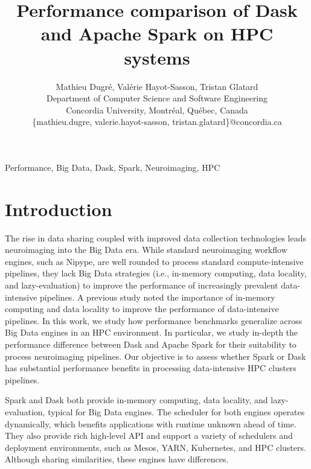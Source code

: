 \documentclass[conference]{IEEEtran}
\begin{document}
\title{Performance comparison of Dask and Apache Spark on HPC systems}

\author{Mathieu Dugr\'e, Val\'erie Hayot-Sasson, Tristan Glatard\\
	Department of Computer Science and Software Engineering\\
	Concordia University, Montr\'eal, Qu\'ebec, Canada\\
	\{mathieu.dugre, valerie.hayot-sasson, tristan.glatard\}@concordia.ca
	\vspace*{0.8cm} %
}

\maketitle

\begin{abstract}
\end{abstract}

\begin{IEEEkeywords}
	Performance, Big Data, Dask, Spark, Neuroimaging, HPC
\end{IEEEkeywords}

\section{Introduction}
The rise in data sharing coupled with improved data collection technologies leads neuroimaging into the Big Data era\cite{ALFAROALMAGRO:18, van2014human, ConpPortal}.
While standard neuroimaging workflow engines, such as Nipype\cite{Nipype:11}, are well rounded to process standard compute-intensive pipelines,
they lack Big Data strategies (i.e., in-memory computing, data locality, and lazy-evaluation) to improve the performance of increasingly prevalent data-intensive pipelines.
A previous study\cite{hayot2019performance} noted the importance of in-memory computing and data locality to improve the performance of data-intensive pipelines.
In this work, we study how performance benchmarks generalize across Big Data engines in an HPC environment.
In particular, we study in-depth the performance difference between Dask\cite{Dask:15} and Apache Spark\cite{Spark:16} for their suitability to process neuroimaging pipelines.
Our objective is to assess whether Spark or Dask has substantial performance benefits in processing data-intensive HPC clusters pipelines.

Spark and Dask both provide in-memory computing, data locality, and lazy-evaluation, typical for Big Data engines.
The scheduler for both engines operates dynamically, which benefits applications with runtime unknown ahead of time\cite{Dask:15}.
They also provide rich high-level API and support a variety of schedulers and deployment environments, such as Mesos\cite{hindman2011mesos}, YARN\cite{vavilapalli2013apache}, Kubernetes, and HPC clusters.
Although sharing similarities, these engines have differences.
\end{document}
